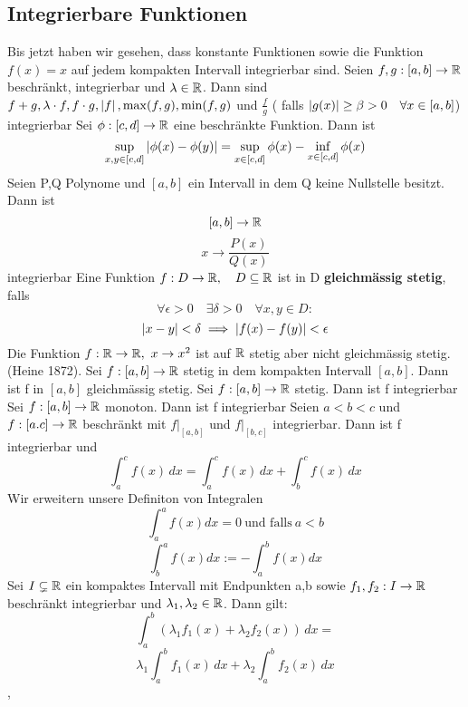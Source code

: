 \subsection{Integrierbare Funktionen}
Bis jetzt haben wir gesehen, dass konstante Funktionen sowie die Funktion \( f(x) = x\) auf jedem kompakten Intervall integrierbar sind. \newline
\Satz[5.10] Seien \(f,g : [a,b] \rightarrow \mathbb{R} \) beschränkt, integrierbar und \( \lambda \in \mathbb{R} \). Dann sind \(f+g, \lambda \cdot f, f \cdot g, \left\lvert f \right\rvert, \max(f,g), \min(f,g) \) und \( \frac{f}{g}\) ( falls \( \left\lvert g(x) \right\rvert \geq \beta > 0 \quad \forall x \in [a,b]\)) integrierbar \newline
{} Sei \( \phi : [c,d] \rightarrow \mathbb{R} \) eine beschränkte Funktion. Dann ist
\[\sup_{x,y \in [c,d]} \left\lvert \phi(x) - \phi(y ) \right\rvert = \sup_{ x \in [c,d]} \phi(x) - \inf_{ x \in [c,d]} \phi(x)\]
\Korollar[5.12] Seien P,Q Polynome und \([a,b]\) ein Intervall in dem Q keine Nullstelle besitzt. Dann ist
\[ [a,b] \rightarrow \mathbb{R} \]
\[ x \rightarrow \frac{P(x)}{Q(x)}\]
integrierbar \newline
\Def[5.13] Eine Funktion \(f: D \rightarrow \mathbb{R}, \quad D \subseteq \mathbb{R}  \) ist in D \textbf{gleichmässig stetig}, falls
 \[ \forall \epsilon > 0 \quad \exists \delta > 0 \quad \forall x,y \in D : \]
\[ \left\lvert x-y \right\rvert < \delta \implies \left\lvert f(x) - f(y) \right\rvert < \epsilon \]
\Bsp[5.14] Die Funktion \( f: \mathbb{R} \rightarrow \mathbb{R}, \  x \rightarrow x^2\) ist auf \( \mathbb{R} \) stetig aber nicht gleichmässig stetig. \newline
\Satz[5.15] (Heine 1872). Sei \(f : [a,b] \rightarrow \mathbb{R}\) stetig in dem kompakten Intervall \([a,b]\). Dann ist f in \([a,b]\) gleichmässig stetig. \newline
\Satz[5.16] Sei \(f: [a,b] \rightarrow \mathbb{R} \) stetig. Dann ist f integrierbar \newline
\Satz[5.17] Sei \(f: [a,b] \rightarrow \mathbb{R}\) monoton. Dann ist f integrierbar \newline
\Bem[5.18] Seien \(a < b < c \) und \(f : [a.c] \rightarrow \mathbb{R} \) beschränkt mit \(f |_{[a,b]}\) und \(f |_{[b,c]}\) integrierbar. Dann ist f integrierbar und
\[ \int_{a}^{c} f(x) \,dx = \int_{a}^{c} f(x) \,dx + \int_{b}^{c} f(x) \,dx \]
\Def{} Wir erweitern unsere Definiton von Integralen
\[ \int_a^a f(x) dx = 0  \ \text{und falls} \ a < b\]
\[ \int_b^a f(x) dx := - \int_a^b f(x) dx\]
\Satz[5.19] Sei \(I \subsetneq \mathbb{R} \) ein kompaktes Intervall mit Endpunkten a,b sowie \(f_1, f_2 : I \rightarrow \mathbb{R} \)  beschränkt integrierbar und \( \lambda_1, \lambda_2 \in \mathbb{R} \). Dann gilt:
\[ \int_{a}^{b} ( \lambda_1 f_1(x) + \lambda_2 f_2(x)) \,dx = \]
\[\lambda_1 \int_{a}^{b} f_1(x) \,dx + \lambda_2 \int_{a}^{b} f_2(x) \,dx \]
\sep
